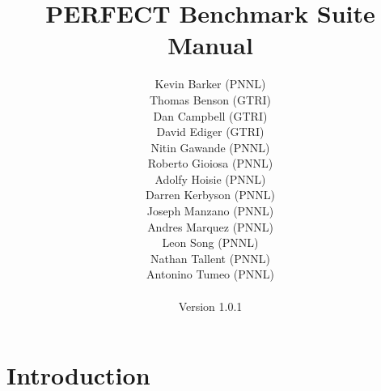 \documentclass{report}
\begin{document}

\title{PERFECT Benchmark Suite Manual}

\author{
Kevin Barker (PNNL)\\
Thomas Benson (GTRI)\\
Dan Campbell (GTRI)\\
David Ediger (GTRI)\\
Nitin Gawande (PNNL)\\
Roberto Gioiosa (PNNL)\\
Adolfy Hoisie (PNNL)\\
Darren Kerbyson (PNNL)\\
Joseph Manzano (PNNL)\\
Andres Marquez (PNNL)\\
Leon Song (PNNL)\\
Nathan Tallent (PNNL)\\
Antonino Tumeo (PNNL)\\
\\
Version 1.0.1
}



\date{}

\maketitle


\tableofcontents


\chapter{Introduction}

\end{document}
